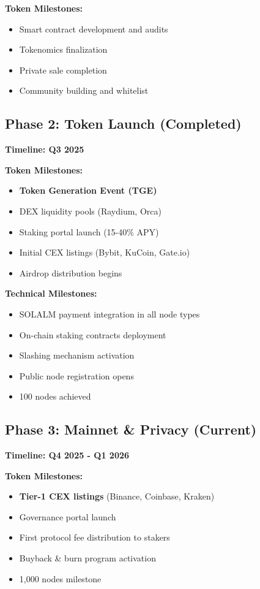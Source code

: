 \documentclass[11pt,a4paper]{article}
\begin{document}
\textbf{Token Milestones:}
\begin{itemize}
    \item[$\checkmark$] Smart contract development and audits
    \item[$\checkmark$] Tokenomics finalization
    \item[$\checkmark$] Private sale completion
    \item[$\checkmark$] Community building and whitelist
\end{itemize}

\subsection{Phase 2: Token Launch (Completed)}

\textbf{Timeline: Q3 2025}

\textbf{Token Milestones:}
\begin{itemize}
    \item[$\checkmark$] \textbf{Token Generation Event (TGE)}
    \item[$\checkmark$] DEX liquidity pools (Raydium, Orca)
    \item[$\checkmark$] Staking portal launch (15-40\% APY)
    \item[$\checkmark$] Initial CEX listings (Bybit, KuCoin, Gate.io)
    \item[$\checkmark$] Airdrop distribution begins
\end{itemize}

\textbf{Technical Milestones:}
\begin{itemize}
    \item[$\checkmark$] SOLALM payment integration in all node types
    \item[$\checkmark$] On-chain staking contracts deployment
    \item[$\checkmark$] Slashing mechanism activation
    \item[$\checkmark$] Public node registration opens
    \item[$\checkmark$] 100 nodes achieved
\end{itemize}

\subsection{Phase 3: Mainnet \& Privacy (Current)}

\textbf{Timeline: Q4 2025 - Q1 2026}

\textbf{Token Milestones:}
\begin{itemize}
    \item \textbf{Tier-1 CEX listings} (Binance, Coinbase, Kraken)
    \item Governance portal launch
    \item First protocol fee distribution to stakers
    \item Buyback \& burn program activation
    \item 1,000 nodes milestone
\end{itemize}
\end{document}
